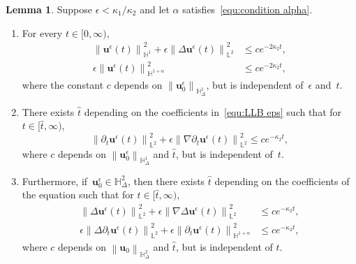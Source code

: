 \documentclass[11pt,reqno]{amsart}
\theoremstyle{definition}
\newtheorem{lemma}[theorem]{Lemma}
\numberwithin{equation}{section}
\newcommand{\bff}{\boldsymbol}
\newcommand{\bb}{\mathbb}
\newcommand{\pa}{\partial}
\newcommand{\norm}[2]{\left\|{#1}\right\|_{#2}}
\begin{document}
\begin{lemma}\label{lem:dec}
	Suppose $\epsilon<\kappa_1/\kappa_2$ and let $\alpha$ satisfies~\eqref{equ:condition alpha}.
	\begin{enumerate}
	\renewcommand{\labelenumi}{\theenumi}
	\renewcommand{\theenumi}{{\rm (\roman{enumi})}}
		\item 
			For every $t\in [0,\infty)$, 
			\begin{align}
				\label{equ:decay u}
				\norm{\bff{u}^\epsilon(t)}{\bb{H}^1}^2
				+
				\epsilon \norm{\Delta\bff{u}^\epsilon(t)}{\bb{L}^2}^2
				&\leq
				c e^{-2\kappa_2 t},
				\\
				\label{equ:u H alpha decay}
				\epsilon\norm{\bff{u}^\epsilon(t)}{\bb{H}^{1+\alpha}}^2
				&\leq
				ce^{-2\kappa_2 t},
			\end{align}
			where the constant $c$ depends on
			$\norm{\bff{u}_0^\epsilon}{\bb{H}^1_\Delta}$, but is independent
			of~$\epsilon$ and~$t$.
		\item 
			There exists $\hat{t}$ depending on the coefficients
			in~\eqref{equ:LLB eps} such that for $t\in
			[\hat{t},\infty)$,
			\begin{equation}\label{equ:decay dt u}
				\norm{\partial_t \bff{u}^\epsilon(t)}{\bb{L}^2}^2
				+
				\epsilon \norm{\nabla \partial_t \bff{u}^\epsilon(t)}{\bb{L}^2}^2
				\leq
				ce^{-\kappa_2 t},
			\end{equation}
			where $c$ depends on $\norm{\bff{u}_0^\epsilon}{\bb{H}^1_\Delta}$ and
			$\hat{t}$, but is independent of~$t$.

		\item 
			Furthermore, if~$\bff{u}_0^\epsilon\in\bb{H}^2_\Delta$, then there
			exists $\hat{t}$ depending on the coefficients of the
			equation such that for $t\in [\hat{t},\infty)$,
			\begin{align}
				\label{equ:decay delta u}
				\norm{\Delta \bff{u}^\epsilon(t)}{\bb{L}^2}^2
				+
				\epsilon \norm{\nabla \Delta \bff{u}^\epsilon(t)}{\bb{L}^2}^2
				&\leq
				ce^{-\kappa_2 t},
				\\
				\label{equ:decay delta dt u}
				\epsilon \norm{\Delta \partial_t \bff{u}^\epsilon(t)}{\bb{L}^2}^2
				+
				\epsilon \norm{\pa_t \bff{u}^\epsilon (t)}{\bb{H}^{1+\alpha}}^2
				&\leq
				ce^{-\kappa_2 t},
			\end{align}
			where $c$ depends on $\norm{\bff{u}_0}{\bb{H}^2_\Delta}$ and
			$\hat{t}$, but is
			independent of $t$.
	\end{enumerate}

\end{lemma}
\end{document}
